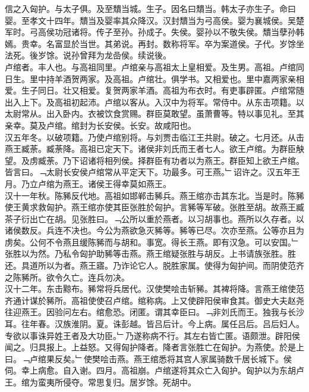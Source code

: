 \documentclass{zhvt-classic}
\begin{document}
\hspace*{2em}信之入匈护。与太子俱。及至穨当城。生子。因名曰穨当。韩太子亦生子。命曰婴。至孝文十四年。穨当及婴率其众降汉。汉封穨当为弓高侯。婴为襄城侯。吴楚军时。弓高侯功冠诸将。传子至孙。孙成子。失侯。婴孙以不敬失侯。穨当孽孙韩嫣。贵幸。名富显於当世。其弟说。再封。数称将军。卒为案道侯。子代。岁馀坐法死。後岁馀。说孙曾拜为龙嵒侯。续说後。\\
\hspace*{2em}卢绾者。丰人也。与高祖同里。卢绾亲与高祖太上皇相爱。及生男。高祖。卢绾同日生。里中持羊酒贺两家。及高祖。卢绾壮。俱学书。又相爱也。里中嘉两家亲相爱。生子同日。壮又相爱。复贺两家羊酒。高祖为布衣时。有吏事辟匿。卢绾常随出入上下。及高祖初起沛。卢绾以客从。入汉中为将军。常侍中。从东击项籍。以太尉常从。出入卧内。衣被饮食赏赐。群臣莫敢望。虽萧曹等。特以事见礼。至其亲幸。莫及卢绾。绾封为长安侯。长安。故咸阳也。\\
\hspace*{2em}汉五年冬。以破项籍。乃使卢绾别将。与刘贾击临江王共尉。破之。七月还。从击燕王臧荼。臧荼降。高祖已定天下。诸侯非刘氏而王者七人。欲王卢绾。为群臣觖望。及虏臧荼。乃下诏诸将相列侯。择群臣有功者以为燕王。群臣知上欲王卢绾。皆言曰。﹁太尉长安侯卢绾常从平定天下。功最多。可王燕。﹂诏许之。汉五年王月。乃立卢绾为燕王。诸侯王得幸莫如燕王。\\
\hspace*{2em}汉十一年秋。陈豨反代地。高祖如邯郸击豨兵。燕王绾亦击其东北。当是时。陈豨使王黄求救匈护。燕王绾亦使其臣张胜於匈护。言豨等军破。张胜至胡。故燕王臧茶子衍出亡在胡。见张胜曰。﹁公所以重於燕者。以习胡事也。燕所以久存者。以诸侯数反。兵连不决也。今公为燕欲急灭豨等。豨等已尽。次亦至燕。公等亦且为虏矣。公何不令燕且缓陈豨而与胡和。事宽。得长王燕。即有汉急。可以安国。﹂张胜以为然。乃私令匈护助豨等击燕。燕王绾疑张胜与胡反。上书请族张胜。胜还。具道所以为者。燕王寤。乃诈论它人。脱胜家属。使得为匈护间。而阴使范齐之陈豨所。欲令久亡。连兵勿决。\\
\hspace*{2em}汉十二年。东击黥布。豨常将兵居代。汉使樊哙击斩豨。其裨将降。言燕王绾使范齐通计谋於豨所。高祖使使召卢绾。绾称病。上又使辟阳侯审食其。御史大夫赵尧往迎燕王。因验问左右。绾愈恐。闭匿。谓其幸臣曰。﹁非刘氏而王。独我与长沙耳。往年春。汉族淮阴。夏。诛彭越。皆吕后计。今上病。属任吕后。吕后妇人。专欲以事诛异姓王者及大功臣。﹂乃遂称病不行。其左右皆亡匿。语颇泄。辟阳侯闻之。归具报上。上益怒。又得匈护降者。降者言张胜亡在匈护。为燕使。於是上曰。﹁卢绾果反矣。﹂使樊哙击燕。燕王绾悉将其宫人家属骑数千居长城下。侯伺。幸上病愈。自入谢。四月。高祖崩。卢绾遂将其众亡入匈护。匈护以为东胡卢王。绾为蛮夷所侵夺。常思复归。居岁馀。死胡中。\\
\end{document}

